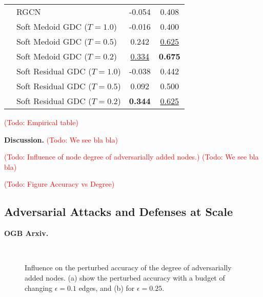 \documentclass{article} %
\newcommand{\todo}[1]{\textcolor{red}{(Todo: #1)}}
\begin{document}
\begin{table}
\begin{tabular}{llcc}
                         & RGCN &             -0.054 &              0.408 \\
                         & Soft Medoid GDC ($T=1.0$) &             -0.016 &              0.400 \\
                         & Soft Medoid GDC ($T=0.5$) &              0.242 &  \underline{0.625} \\
                         & Soft Medoid GDC ($T=0.2$) &  \underline{0.334} &     \textbf{0.675} \\
                         & Soft Residual GDC ($T=1.0$) &             -0.038 &              0.442 \\
                         & Soft Residual GDC ($T=0.5$) &              0.092 &              0.500 \\
                         & Soft Residual GDC ($T=0.2$) &     \textbf{0.344} &  \underline{0.625} \\
\bottomrule
\end{tabular}
\end{table}

\todo{Empirical table}

\textbf{Discussion.} \todo{We see bla bla}

\todo{Influence of node degree of adversarially added nodes.} \todo{We see bla bla}

\todo{Figure Accuracy vs Degree}

\subsection{Adversarial Attacks and Defenses at Scale}\label{sec:empiricalscale}

\textbf{OGB Arxiv.} 

\begin{figure}
  \centering
  \vspace{-15pt}
  \hbox{\hspace{15pt} \resizebox{0.9\linewidth}{!}{}}
  \vspace{-14pt}
  \caption{Influence on the perturbed accuracy of the degree of adversarially added nodes. (a) show the perturbed accuracy with a budget of changing \(\epsilon=0.1\) edges, and (b) for \(\epsilon=0.25\).\label{fig:gangnodeeffectiveness}}
\end{figure}
\end{document}
